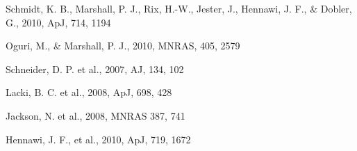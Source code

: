 \documentclass[a4paper,11pt]{article}
\begin{document}

\begin{thebibliography}{99}

Schmidt, K. B., Marshall, P. J., Rix, H.-W., Jester, J., Hennawi, J. F., \& Dobler, G., 2010, ApJ, 714, 1194 

Oguri, M., \& Marshall, P. J., 2010, MNRAS, 405, 2579

Schneider, D. P. et al., 2007, AJ, 134, 102

Lacki, B. C. et al., 2008, ApJ, 698, 428

Jackson, N. et al., 2008, MNRAS 387, 741

Hennawi, J. F., et al., 2010, ApJ, 719, 1672
\end{thebibliography}

\end{document}
